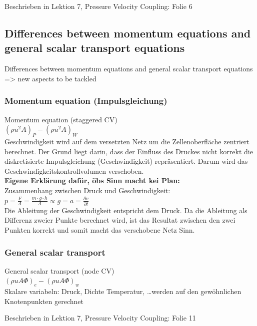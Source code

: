 \documentclass[a4paper]{scrartcl}
\begin{document}
Beschrieben in Lektion 7, Pressure Velocity Coupling: Folie 6


\subsection{Differences between momentum equations and general scalar transport
equations} 
Differences between momentum equations and general scalar transport
equations => new aspects to be tackled\\

\subsubsection{Momentum equation (Impulsgleichung)}
Momentum equation (staggered CV)\\
$(\rho u^2 A)_P - (\rho u^2 A)_W$\\
Geschwindigkeit wird auf dem versetzten Netz um die Zellenoberfläche
zentriert berechnet. Der Grund liegt darin, dass der Einfluss des
Druckes nicht korrekt die diskretisierte Impulsgleichung (Geschwindigkeit)
repräsentiert. Darum wird das Geschwindigkeitskontrollvolumen verschoben.\\

\textbf{Eigene Erklärung dafür, öbs Sinn macht kei Plan:}\\
Zusammenhang zwischen Druck und Geschwindigkeit: $p = \frac{F}{A} = \frac{m
\cdot g \cdot h}{A} \propto g = a = \frac{\partial v}{\partial t}$\\
Die Ableitung der Geschwindigkeit entspricht dem Druck. Da die Ableitung als
Differenz zweier Punkte berechnet wird, ist das Resultat zwischen den zwei
Punkten korrekt und somit macht das verschobene Netz Sinn.

\subsubsection{General scalar transport}
General scalar transport (node CV)\\
$(\rho u A \Phi)_e - (\rho u A \Phi)_w$\\
Skalare variabeln: Druck, Dichte Temperatur, \ldots werden auf den gewöhnlichen
Knotenpunkten gerechnet

Beschrieben in Lektion 7, Pressure Velocity Coupling: Folie 11
\end{document}
